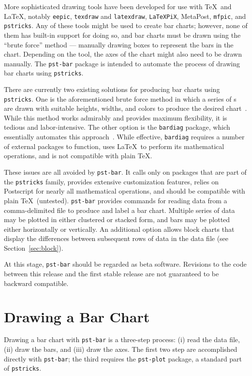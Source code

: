\documentclass[11pt,english,BCOR10mm,DIV12,bibliography=totoc,parskip=false,smallheadings
    headexclude,footexclude,oneside]{pst-doc}
\begin{document}
    More sophisticated drawing tools have been developed for use with \TeX\ and
    \LaTeX, notably \verb|eepic|, \verb|texdraw| and \verb|latexdraw|,
    \verb|LaTeXPiX|, MetaPost, \verb|mfpic|, and \verb|pstricks|. Any of these
    tools might be used to create bar charts; however, none of them has
    built-in support for doing so, and bar charts must be drawn using the
    ``brute force'' method --- manually drawing boxes to represent the bars in
    the chart. Depending on the tool, the axes of the chart might also need to
    be drawn manually. The \verb|pst-bar| package is intended to automate the
    process of drawing bar charts using \verb|pstricks|.

    There are currently two existing solutions for producing bar charts using
    \verb|pstricks|. One is the aforementioned brute force method in which a
    series of s are drawn with suitable heights, widths, and
    colors to produce the desired chart~\cite{voss:barcharts}. While this
    method works admirably and provides maximum flexibility, it is tedious and
    labor-intensive. The other option is the \verb|bardiag| package, which
    essentially automates this approach~\cite{stepanyan:03}. While effective,
    \verb|bardiag| requires a number of external packages to function, uses
    \LaTeX\ to perform its mathematical operations, and is not compatible with
    plain \TeX.

    These issues are all avoided by \verb|pst-bar|. It calls only on packages
    that are part of the \verb|pstricks| family, provides extensive
    customization features, relies on Postscript for nearly all mathematical
    operations, and should be compatible with plain \TeX\ (untested).
    \verb|pst-bar| provides commands for reading data from a comma-delimited
    file to produce and label a bar chart. Multiple series of data may be
    plotted in either clustered or stacked form, and bars may be plotted either
    horizontally or vertically. An additional option allows block charts that
    display the differences between subsequent rows of data in the data file
    (see Section~\ref{sec:block}).

    At this stage, \verb|pst-bar| should be regarded as beta software.
    Revisions to the code between this release and the first stable release are
    not guaranteed to be backward compatible.

  \section{Drawing a Bar Chart}
    Drawing a bar chart with \verb|pst-bar| is a three-step process: (i) read
    the data file, (ii) draw the bars, and (iii) draw the axes. The first two
    step are accomplished directly with \verb|pst-bar|; the third requires the
    \verb|pst-plot| package, a standard part of \verb|pstricks|.
\end{document}
